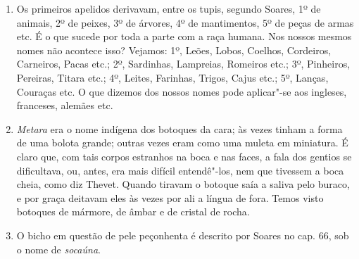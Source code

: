 \begin{enumerate}
\item Os primeiros apelidos derivavam, entre os tupis, segundo Soares, 1º de animais, 2º 
de peixes, 3º de árvores, 4º de mantimentos, 5º de peças de armas etc.
É o que sucede por toda a parte com a raça humana. Nos nossos mesmos nomes não 
acontece isso? Vejamos: 1º, Leões, Lobos, Coelhos, Cordeiros, Carneiros, Pacas etc.; 2º, 
Sardinhas, Lampreias, Romeiros etc.; 3º, Pinheiros, Pereiras, Titara etc.; 4º, Leites, 
Farinhas, Trigos, Cajus etc.; 5º, Lanças, Couraças etc. O que dizemos dos nossos nomes 
pode aplicar"-se aos ingleses, franceses, alemães etc.

\item \textit{Metara} era o nome indígena dos botoques da cara; às vezes tinham a forma de uma 
bolota grande; outras vezes eram como uma muleta em miniatura. É claro que, com tais 
corpos estranhos na boca e nas faces, a fala dos gentios se dificultava, ou, antes, era 
mais difícil entendê"-los, nem que tivessem a boca cheia, como diz Thevet. Quando 
tiravam o botoque saía a saliva pelo buraco, e por graça deitavam eles às vezes por ali a 
língua de fora. Temos visto botoques de mármore, de âmbar e de cristal de rocha.

\item O bicho em questão de pele peçonhenta é descrito por Soares no cap. 66, sob o 
nome de \textit{socaúna}.


\end{enumerate}
